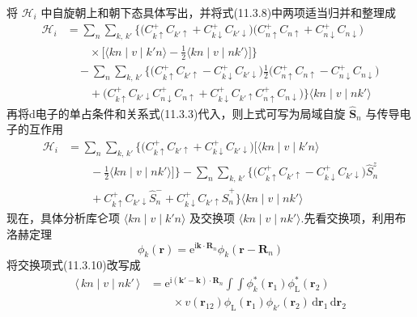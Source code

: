将 $\mathscr{H}_{i}$ 中自旋朝上和朝下态具体写出，并将式(11.3.8)中两项适当归并和整理成
\begin{equation}
\begin{aligned}
  \mathscr{H}_{i}&=\sum_{n}\sum_{k,\,k'}
  \bigl\{\bigl(C^{+}_{k\uparrow}C_{k'\uparrow}
  +C^{+}_{k\downarrow}C_{k'\downarrow}\bigr)
  \bigl(C^{+}_{n\uparrow}C_{n\uparrow}
  +C^{+}_{n\downarrow}C_{n\downarrow}\bigr)\\
  &\qquad\times\bigl[\langle kn\mid v\mid k'n\rangle
  -\frac{1}{2}\langle kn\mid v\mid nk'\rangle\bigr]\bigr\}\\
  &\quad-\sum_{n}\sum_{k,\,k'}\bigl\{\bigl(C^{+}_{k\uparrow}C_{k'\uparrow}
  -C^{+}_{k\downarrow}C_{k'\downarrow}\bigr)
  \frac{1}{2}\bigl(C^{+}_{n\uparrow}C_{n\uparrow}
  -C^{+}_{n\downarrow}C_{n\downarrow}\bigr)\\
  &\qquad+\bigl(C^{+}_{k\uparrow}C_{k'\downarrow}C^{+}_{n\downarrow}C_{n\uparrow}
  +C^{+}_{k\downarrow}C_{k'\uparrow}C^{+}_{n\uparrow}C_{n\downarrow}\bigr)\bigr\}
  \langle kn\mid v\mid nk'\rangle
\end{aligned}
\end{equation}
再将d电子的单占条件和关系式(11.3.3)代入，则上式可写为局域自旋 $\hat{\boldsymbol{S}}_{n}$ 与传导电子的互作用
\begin{equation}
\begin{aligned}
  \mathscr{H}_{i}&=\sum_{n}\sum_{k,\,k'}
  \bigl\{\bigl(C^{+}_{k\uparrow}C_{k'\uparrow}
  +C^{+}_{k\downarrow}C_{k'\downarrow}\bigr)
  \bigl[\langle kn\mid v\mid k'n\rangle\\
  &\qquad-\frac{1}{2}\langle kn\mid v\mid nk'\rangle\bigr]\bigr\}
  -\sum_{n}\sum_{k,\,k'}\bigl\{\bigl(C^{+}_{k\uparrow}C_{k'\uparrow}
  -C^{+}_{k\downarrow}C_{k'\downarrow}\bigr)\hat{S}^{z}_{n}\\
  &\qquad+C^{+}_{k\uparrow}C_{k'\downarrow}\hat{S}^{-}_{n}
  +C^{+}_{k\downarrow}C_{k'\uparrow}\hat{S}^{+}_{n}\bigr\}
  \langle kn\mid v\mid nk'\rangle
\end{aligned}
\end{equation}
现在，具体分析库仑项 $\langle kn\mid v\mid k'n\rangle$ 及交换项 $\langle kn\mid v\mid nk'\rangle$.先看交换项，利用布洛赫定理
\begin{equation}
  \phi_{k}(\boldsymbol{r})=\mathrm{e}^{\mathrm{i}\boldsymbol{k}\cdot\boldsymbol{R}_{n}}
  \phi_{k}(\boldsymbol{r}-\boldsymbol{R}_{n})
\end{equation}
将交换项式(11.3.10)改写成
\begin{equation}
\begin{aligned}
  \langle\,kn\mid v\mid nk'\,\rangle
  &=\mathrm{e}^{\mathrm{i}(\boldsymbol{k}'-\boldsymbol{k})\cdot\boldsymbol{R}_{n}}
  \int\!\!\int\phi^{*}_{k}(\boldsymbol{r}_{1})
  \phi^{*}_{\mathrm{L}}(\boldsymbol{r}_{2})\\
  &\qquad\times v(\boldsymbol{r}_{12})
  \phi_{\mathrm{L}}(\boldsymbol{r}_{1})\phi_{k'}(\boldsymbol{r}_{2})
  \,\mathrm{d}\boldsymbol{r}_{1}\,\mathrm{d}\boldsymbol{r}_{2}
\end{aligned}
\end{equation}
